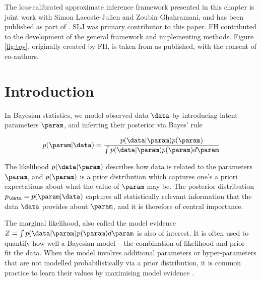 \begin{summarycontributions}
The loss-calibrated approximate inference framework presented in this chapter is joint work with Simon Lacoste-Julien and Zoubin Ghahramani, and has been published as part of \citep{Lacoste2011}. SLJ was primary contributor to this paper. FH contributed to the development of the general framework and implementing methods. Figure \ref{fig:toy}, originally created by FH, is taken from \citep{Lacoste2011} as published, with the consent of co-authors.
\end{summarycontributions}


\section{Introduction}

In Bayesian statistics, we model observed data $\data$ by introducing latent parameters $\param$, and inferring their posterior via Bayes' rule

\begin{equation}
	p(\param\vert\data) = \frac{p(\data\vert\param) p(\param)}{\int p(\data\vert\param) p(\param) d\param}
\end{equation}

The likelihood $p(\data\vert\param)$ describes how data is related to the parameters $\param$, and $p(\param)$ is a prior distribution which captures one's a priori expectations about what the value of $\param$ may be. The posterior distribution $p_\data = p(\param\vert\data)$ captures all statistically relevant information that the data $\data$ provides about $\param$, and it is therefore of central importance.

The marginal likelihood, also called the model evidence $Z = \int p(\data\vert\param) p(\param) d\param$ is also of interest. It is often used to quantify how well a Bayesian model -- the combination of likelihood and prior -- fit the data. When the model involves additional parameters or hyper-parameters that are not modelled probabilistically via a prior distribution, it is common practice to learn their values by maximising model evidence \citep[see \eg][Chapter 5]{Rasmussen2006}.

